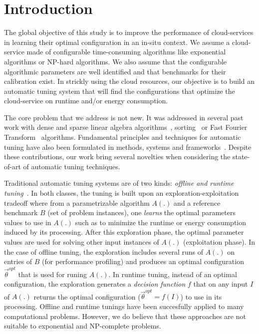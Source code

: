 \documentclass[10pt, conference, compsocconf]{IEEEtran}
\begin{document}
\section{Introduction}

The global objective of this study is to improve the performance of cloud-services in learning their optimal 
configuration in an  in-situ context. We assume a  cloud-service  made of configurable 
time-consuming algorithms like exponential algorithms or  NP-hard algorithms. We also 
assume that the configurable algorithmic parameters are well identified and that benchmarks for their calibration exist. 
In strickly using the cloud resources, our objective is to build an automatic tuning system that will find    
the configurations that optimize the cloud-service on runtime and/or energy consumption.

The core problem that we address is not new. It was addressed in several past work with  
dense and sparse linear algebra algorithms~\cite{ATLAS,Spiral}, sorting~\cite{Spiral} or Fast Fourier Transform~\cite{FFTW} 
algorithms. Fundamental principles and techniques for automatic tuning have also been formulated in methods, 
systems and frameworks~\cite{Rice,Tapus:2002:AHT:762761.762771,ansel:cases:2012}. Despite these contributions, our work bring 
several novelties when considering the state-of-art of automatic tuning techniques. 

Traditional automatic tuning systems are of two kinds: {\it offline and runtime tuning}~\cite{Tichy:2014:APS:2636925.2636340}. 
In both classes, the tuning is built upon an exploration-exploitation tradeoff where from a parametrizable algorithm $A(.)$ 
and a reference benchmark $B$ (set of problem instances), one {\it learns} the optimal parameters values to use in $A(.)$ 
such as to  minimize the runtime or energy consumption induced by its processing. 
After this exploration phase, the optimal parameter values are used for solving other input instances of $A(.)$ (exploitation phase). 
In the case of offline tuning, the exploration includes several runs of $A(.)$ on entries of $B$ (for performance profiling) 
and produces an optimal configuration $\vec{\theta}^{opt}$ that is used for runing $A(.)$. 
In runtime tuning, instead of an optimal configuration, the exploration generates a {\it decision function} $f$ 
that on any input $I$ of $A(.)$ returns the optimal configuration ($\vec{\theta}^{opt} = f(I)$) to use in its processing. 
Offline and runtime tunings have been succesfully applied to many computational problems. However, we do believe that 
these approaches are not suitable to exponential and NP-complete problems. 
\end{document}
